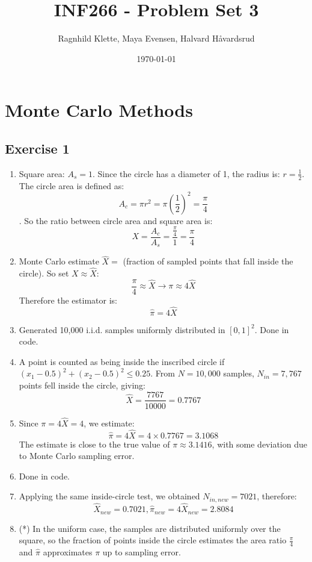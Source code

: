 \documentclass{article}
\title{INF266 - Problem Set 3}
\author{Ragnhild Klette, Maya Evensen, Halvard Håvardsrud}
\date{\today}
\begin{document}
\maketitle

\section{Monte Carlo Methods}
\subsection*{Exercise 1}
\begin{enumerate}
    \item Square area: $A_s = 1$. 
    Since the circle has a diameter of 1, the radius is: $r=\frac12$.
    The circle area is defined as: \[A_c= \pi r^2 =\pi(\frac{1}{2})^2 = \frac{\pi}{4}\].
    So the ratio between circle area and square area is: \[X=\frac{A_c}{A_s}=\frac{\frac{\pi}{4}}{1}=\frac{\pi}{4} \]

    \item Monte Carlo estimate $\hat X =$ (fraction of sampled points that fall inside the circle).
    So set $X \approx \hat{X}$: \[\frac{\pi}{4} \approx \hat{X} \rightarrow \pi \approx 4\hat{X}\]
    Therefore the estimator is: \[\hat{\pi}=4\hat{X}\]

    \item  Generated 10,000 i.i.d. samples uniformly distributed in $[0,1]^2$. Done in code.
    
    \item A point is counted as being inside the inscribed circle if $(x_1 - 0.5)^2 + (x_2 - 0.5)^2 \leq 0.25$. From $N= 10,000$ samples, $N_{in} = 7,767$ points fell inside the circle, giving: \[\hat{X} = \frac{7767}{10000} = 0.7767\]
    
    \item Since $\pi = 4\hat{X} = 4$, we estimate: \[\hat{\pi} = 4\hat{X} = 4 \times 0.7767 = 3.1068\]
    The estimate is close to the true value of $\pi \approx 3.1416$, with some deviation due to Monte Carlo sampling error.

    \item Done in code.

    \item Applying the same inside-circle test, we obtained $N_{in,new} = 7021$, therefore: 
    \[\hat{X}_{new} = 0.7021 , \hat{\pi}_{new} = 4\hat{X}_{new} = 2.8084\]
    
    \item (*) In the uniform case, the samples are distributed uniformly over the square, so the fraction of points inside the circle estimates the area ratio $\frac{\pi}{4}$ and $\hat{\pi}$ approximates $\pi$ up to sampling error.


\end{enumerate}
\end{document}
